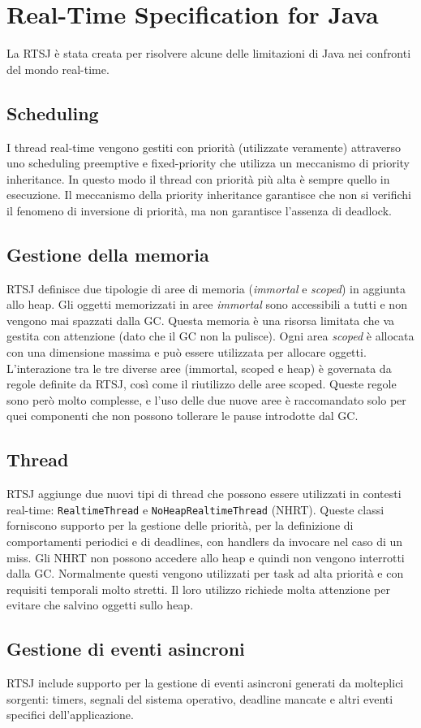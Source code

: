 \section{Real-Time Specification for Java}
La RTSJ è stata creata per risolvere alcune delle limitazioni di Java nei confronti del mondo real-time. 

\subsection{Scheduling}
I thread real-time vengono gestiti con priorità (utilizzate veramente) attraverso uno scheduling preemptive e fixed-priority che utilizza un meccanismo di priority inheritance. In questo modo il thread con priorità più alta è sempre quello in esecuzione. Il meccanismo della priority inheritance garantisce che non si verifichi il fenomeno di inversione di priorità, ma non garantisce l'assenza di deadlock.

\subsection{Gestione della memoria}
RTSJ definisce due tipologie di aree di memoria (\textit{immortal} e \textit{scoped}) in aggiunta allo heap. Gli oggetti memorizzati in aree \textit{immortal} sono accessibili a tutti e non vengono mai spazzati dalla GC. Questa memoria è una risorsa limitata che va gestita con attenzione (dato che il GC non la pulisce). Ogni area \textit{scoped} è allocata con una dimensione massima e può essere utilizzata per allocare oggetti. L'interazione tra le tre diverse aree (immortal, scoped e heap) è governata da regole definite da RTSJ, così come il riutilizzo delle aree scoped. Queste regole sono però molto complesse, e l'uso delle due nuove aree è raccomandato solo per quei componenti che non possono tollerare le pause introdotte dal GC.

\subsection{Thread}
RTSJ aggiunge due nuovi tipi di thread che possono essere utilizzati in contesti real-time: \texttt{RealtimeThread} e \texttt{NoHeapRealtimeThread} (NHRT). Queste classi forniscono supporto per la gestione delle priorità, per la definizione di comportamenti periodici e di deadlines, con handlers da invocare nel caso di un miss. Gli NHRT non possono accedere allo heap e quindi non vengono interrotti dalla GC. Normalmente questi vengono utilizzati per task ad alta priorità e con requisiti temporali molto stretti. Il loro utilizzo richiede molta attenzione per evitare che salvino oggetti sullo heap. 

\subsection{Gestione di eventi asincroni}
RTSJ include supporto per la gestione di eventi asincroni generati da molteplici sorgenti: timers, segnali del sistema operativo, deadline mancate e altri eventi specifici dell'applicazione.